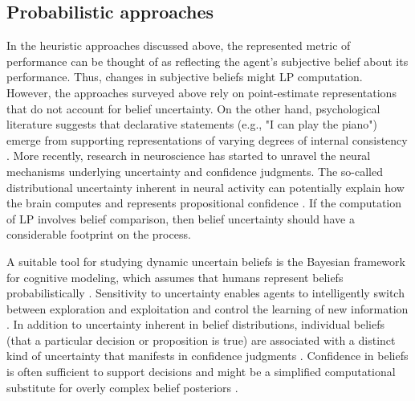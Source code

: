 \subsection{Probabilistic approaches}

In the heuristic approaches discussed above, the represented metric of performance can be thought of as reflecting the agent's subjective belief about its performance. Thus, changes in subjective beliefs might \ac{LP} computation. However, the approaches surveyed above rely on point-estimate representations that do not account for belief uncertainty. On the other hand, psychological literature suggests that declarative statements (e.g., "I can play the piano") emerge from supporting representations of varying degrees of internal consistency \cite{smith_belief_1991,koriat_self-consistency_2012}. More recently, research in neuroscience has started to unravel the neural mechanisms underlying uncertainty and confidence judgments. The so-called distributional uncertainty inherent in neural activity can potentially explain how the brain computes and represents propositional confidence \cite{meyniel_confidence_2015,pouget_confidence_2016}. If the computation of \ac{LP} involves belief comparison, then belief uncertainty should have a considerable footprint on the process. 

A suitable tool for studying dynamic uncertain beliefs is the Bayesian framework for cognitive modeling, which assumes that humans represent beliefs probabilistically \cite{sun_bayesian_2008,perfors_tutorial_2011,coenen_asking_2019}. Sensitivity to uncertainty enables agents to intelligently switch between exploration and exploitation \cite{cohen_should_2007} and control the learning of new information \cite{meyniel_confidence_2015}. In addition to uncertainty inherent in belief distributions, individual beliefs (that a particular decision or proposition is true) are associated with a distinct kind of uncertainty that manifests in confidence judgments \cite{pouget_confidence_2016}. Confidence in beliefs is often sufficient to support decisions and might be a simplified computational substitute for overly complex belief posteriors \cite{pouget_confidence_2016}.  

